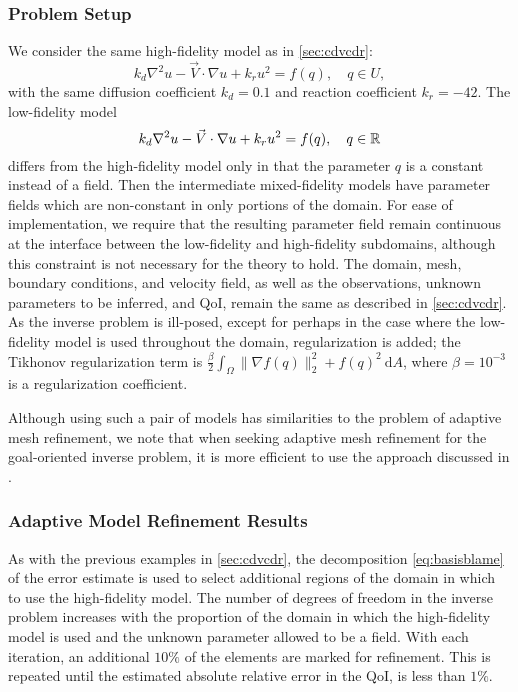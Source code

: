 \subsubsection{Problem Setup}
We consider the same high-fidelity model as in \cref{sec:cdvcdr}:
\begin{equation}
k_d\nabla^2 u - \vec{V}\cdot\nabla u + k_ru^2= f(q),\quad q\in U,
\end{equation}
with the same diffusion coefficient $k_d = 0.1$  and reaction coefficient $k_r = -42$. The low-fidelity model
\begin{equation}
k_d\nabla^2 u - \vec{V}\cdot\nabla u + k_ru^2= f(q),\quad q\in{\mathbb{R}}
\end{equation}
differs from the high-fidelity model only in that the parameter $q$ is a constant instead of a field. Then the intermediate mixed-fidelity models have parameter fields which are non-constant in only portions of the domain. For ease of implementation, we require that the resulting parameter field remain continuous at the interface between the low-fidelity and high-fidelity subdomains, although this constraint is not necessary for the theory to hold. The domain, mesh, boundary conditions, and velocity field, as well as the observations, unknown parameters to be inferred, and QoI, remain the same as described in \cref{sec:cdvcdr}. As the inverse problem is ill-posed, except for perhaps in the case where the low-fidelity model is used throughout the domain, regularization is added; the Tikhonov regularization term is $\frac{\beta}{2}\int_\Omega \|\nabla f(q)\|_2^2+f(q)^2\:\textrm{d}A$, where $\beta=10^{-3}$ is a regularization coefficient.

Although using such a pair of models has similarities to the problem of adaptive mesh refinement, we note that when seeking adaptive mesh refinement for the goal-oriented inverse problem, it is more efficient to use the approach discussed in \cite{BecVex05}.
\subsubsection{Adaptive Model Refinement Results}
As with the previous examples in \cref{sec:cdvcdr}, the decomposition \cref{eq:basisblame} of the error estimate is used to select additional regions of the domain in which to use the high-fidelity model. The number of degrees of freedom in the inverse problem increases with the proportion of the domain in which the high-fidelity model is used and the unknown parameter allowed to be a field. With each iteration, an additional $10\%$ of the elements are marked for refinement. This is repeated until the estimated absolute relative error in the QoI, is less than $1\%$.

